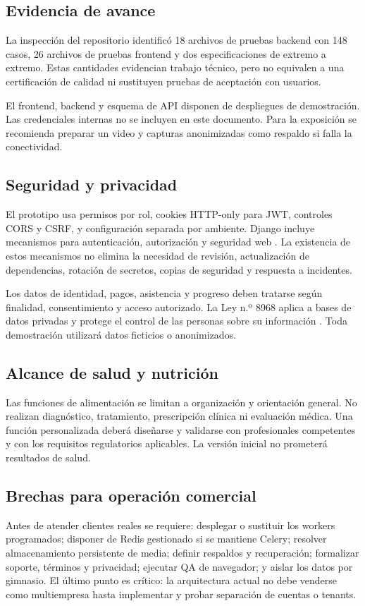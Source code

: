 \subsection{Evidencia de avance}

La inspección del repositorio identificó 18 archivos de pruebas backend con 148
casos, 26 archivos de pruebas frontend y dos especificaciones de extremo a
extremo. Estas cantidades evidencian trabajo técnico, pero no equivalen a una
certificación de calidad ni sustituyen pruebas de aceptación con usuarios.

El frontend, backend y esquema de API disponen de despliegues de demostración.
Las credenciales internas no se incluyen en este documento. Para la exposición
se recomienda preparar un video y capturas anonimizadas como respaldo si falla la
conectividad.

\subsection{Seguridad y privacidad}

El prototipo usa permisos por rol, cookies HTTP-only para JWT, controles CORS y
CSRF, y configuración separada por ambiente. Django incluye mecanismos para
autenticación, autorización y seguridad web \parencite{django51}. La existencia
de estos mecanismos no elimina la necesidad de revisión, actualización de
dependencias, rotación de secretos, copias de seguridad y respuesta a incidentes.

Los datos de identidad, pagos, asistencia y progreso deben tratarse según
finalidad, consentimiento y acceso autorizado. La Ley n.º 8968 aplica a bases de
datos privadas y protege el control de las personas sobre su información
\parencite{ley8968}. Toda demostración utilizará datos ficticios o anonimizados.

\subsection{Alcance de salud y nutrición}

Las funciones de alimentación se limitan a organización y orientación general.
No realizan diagnóstico, tratamiento, prescripción clínica ni evaluación médica.
Una función personalizada deberá diseñarse y validarse con profesionales
competentes y con los requisitos regulatorios aplicables. La versión inicial no
prometerá resultados de salud.

\subsection{Brechas para operación comercial}

Antes de atender clientes reales se requiere: desplegar o sustituir los workers
programados; disponer de Redis gestionado si se mantiene Celery; resolver
almacenamiento persistente de media; definir respaldos y recuperación; formalizar
soporte, términos y privacidad; ejecutar QA de navegador; y aislar los datos por
gimnasio. El último punto es crítico: la arquitectura actual no debe venderse como
multiempresa hasta implementar y probar separación de cuentas o tenants.

